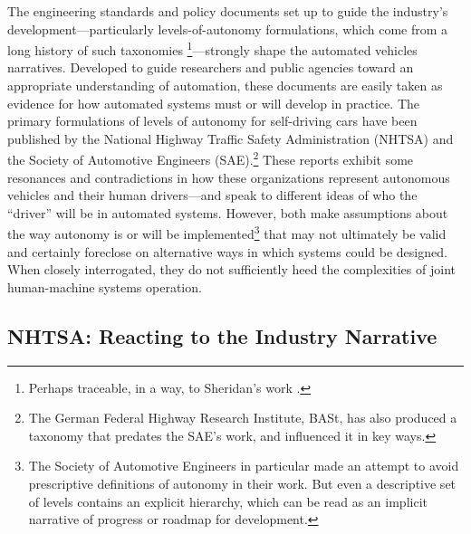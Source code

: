 The engineering standards and
policy documents set up to
guide the industry's development---particularly levels-of-autonomy
formulations, which come from a long history of such taxonomies \cite{parasuramanW} \cite{PSWickens} \cite{ALFUS} \cite{SMART}\footnote{Perhaps traceable, in a way, to 
  Sheridan's work \cite[p. 23]{DSB}.}---strongly shape the automated
vehicles narratives. Developed to guide
researchers and public agencies toward an appropriate understanding of
automation, these documents are easily taken
as evidence for how automated systems must or will develop in
practice. The primary formulations of
levels of autonomy for self-driving cars 
have been published by the National Highway Traffic Safety
Administration (NHTSA) and the Society of Automotive Engineers
(SAE).\footnote{The German Federal Highway Research Institute, BASt,
 has also produced a taxonomy that predates the SAE's work, and
 influenced it in key ways.}
These reports exhibit some resonances and contradictions in how these
organizations represent autonomous vehicles and their human
drivers---and speak to different ideas of who the ``driver'' will be
in automated systems. However, both make assumptions about
the way autonomy is or will be implemented\footnote{The Society of Automotive Engineers in particular
  made an attempt to avoid prescriptive definitions of autonomy in
  their work. But even a descriptive set of levels contains an
  explicit hierarchy, which can be read as an implicit narrative of
  progress or roadmap for development.} that may not ultimately be
valid and certainly foreclose on alternative ways in
which systems could be designed. When closely
interrogated, they do not sufficiently heed the
complexities of joint human-machine systems operation.



\subsection{NHTSA: Reacting to the Industry Narrative}

